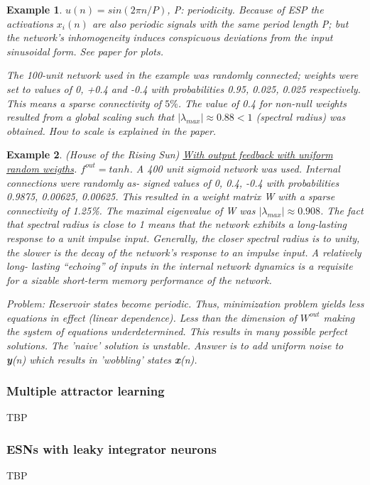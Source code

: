 \documentclass{article}
\newtheorem{example}{Example}
\begin{document}
\begin{example}
$u(n) = sin(2\pi n/P)$, P: periodicity. Because of ESP the activations $x_i(n)$ are also periodic signals with the same period length P; but the network’s inhomogeneity induces conspicuous deviations from the input sinusoidal form. See paper for plots.

The 100-unit network used in the example was randomly connected; weights were set to values of 0, +0.4 and -0.4 with probabilities 0.95, 0.025, 0.025 respectively. This means a sparse connectivity of $5\%$. The value of 0.4 for non-null weights resulted from a global scaling such that $| \lambda_{max} | \approx 0.88 < 1$ (spectral radius) was obtained. How to scale is explained in the paper.
\end{example}

\begin{example}
(House of the Rising Sun) \underline{With output feedback with uniform random weigths}. $f^{out} = tanh$. A 400 unit sigmoid network was used. Internal connections were randomly as- signed values of 0, 0.4, -0.4 with probabilities 0.9875, 0.00625, 0.00625. This resulted in a weight matrix W with a sparse connectivity of 1.25\%. The maximal eigenvalue of W was $| \lambda_{max}| \approx 0.908$. The fact that spectral radius is close to 1 means that the network exhibits a long-lasting response to a unit impulse input. Generally, the closer spectral radius is to unity, the slower is the decay of the network’s response to an impulse input. A relatively long- lasting “echoing” of inputs in the internal network dynamics is a requisite for a sizable short-term memory performance of the network.

Problem: Reservoir states become periodic. Thus, minimization problem yields less equations in effect (linear dependence). Less than the dimension of $W^{out}$ making the system of equations underdetermined. This results in many possible perfect solutions. The 'naive' solution is unstable. Answer is to add uniform noise to \textbf y(n) which results in 'wobbling' states \textbf x(n).
\end{example}

\subsubsection{Multiple attractor learning}
TBP
\subsubsection{ESNs with leaky integrator neurons}
TBP
\end{document}
